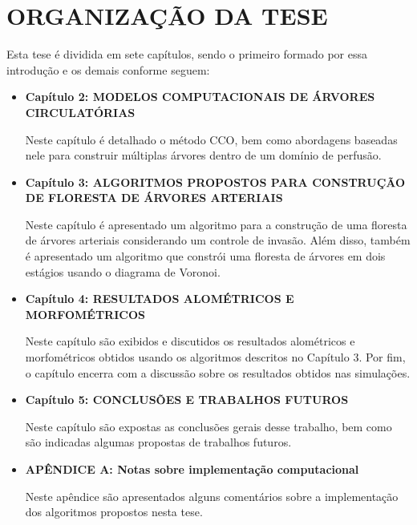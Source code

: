 \section{ORGANIZAÇÃO DA TESE}

Esta tese é dividida em sete capítulos, sendo o primeiro formado por essa introdução e os demais conforme seguem:

\begin{itemize}
  \item \textbf{Capítulo 2: MODELOS COMPUTACIONAIS DE ÁRVORES CIRCULATÓRIAS}
  
  Neste capítulo é detalhado o método CCO, bem como abordagens baseadas nele
  para construir múltiplas árvores dentro de um domínio de perfusão.
  
  \item \textbf{Capítulo 3: ALGORITMOS PROPOSTOS PARA CONSTRUÇÃO DE FLORESTA DE ÁRVORES ARTERIAIS}
  
  Neste capítulo é apresentado um algoritmo para a construção de uma floresta 
  de árvores arteriais considerando um controle de invasão. Além disso, também
  é apresentado um algoritmo que constrói uma floresta de árvores em dois estágios usando o diagrama de Voronoi.
  
  \item \textbf{Capítulo 4: RESULTADOS ALOMÉTRICOS E MORFOMÉTRICOS}
  
  Neste capítulo são exibidos e discutidos os resultados 
  alométricos e morfométricos obtidos usando os algoritmos descritos no Capítulo 3. Por fim, o capítulo 
  encerra com a discussão sobre os resultados obtidos nas simulações.

  \item \textbf{Capítulo 5: CONCLUSÕES E TRABALHOS FUTUROS}
  
  Neste capítulo são expostas as conclusões gerais desse trabalho,
  bem como são indicadas algumas propostas de trabalhos futuros.
  
  \item \textbf{APÊNDICE A: Notas sobre implementação computacional}
  
  Neste apêndice são apresentados alguns comentários sobre a implementação dos algoritmos
  propostos nesta tese.
\end{itemize}
